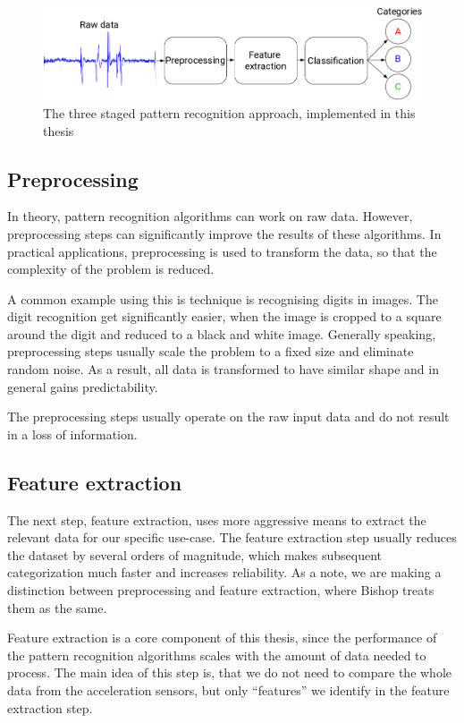 \begin{figure}
    \centering
    \includegraphics[width=\textwidth]{figures/PatternRecognitionSteps.png}
    \caption{The three staged pattern recognition approach, implemented in this thesis}
    \label{fig:patternrecognitionsteps}
\end{figure}

\subsection{Preprocessing}
In theory, pattern recognition algorithms can work on raw data. However, preprocessing steps can significantly improve the results of these algorithms. In practical applications, preprocessing is used to transform the data, so that the complexity of the problem is reduced. 

A common example using this is technique is recognising digits in images. The digit recognition get significantly easier, when the image is cropped to a square around the digit and reduced to a black and white image. Generally speaking, preprocessing steps usually scale the problem to a fixed size and eliminate random noise. As a result, all data is transformed to have similar shape and in general gains predictability.

The preprocessing steps usually operate on the raw input data and do not result in a loss of information.

\subsection{Feature extraction}
The next step, feature extraction, uses more aggressive means to extract the relevant data for our specific use-case. The feature extraction step usually reduces the dataset by several orders of magnitude, which makes subsequent categorization much faster and increases reliability. As a note, we are making a distinction between preprocessing and feature extraction, where Bishop \cite{bishop2006pattern} treats them as the same.

Feature extraction is a core component of this thesis, since the performance of the pattern recognition algorithms scales with the amount of data needed to process. The main idea of this step is, that we do not need to compare the whole data from the acceleration sensors, but only ``features'' we identify in the feature extraction step.

